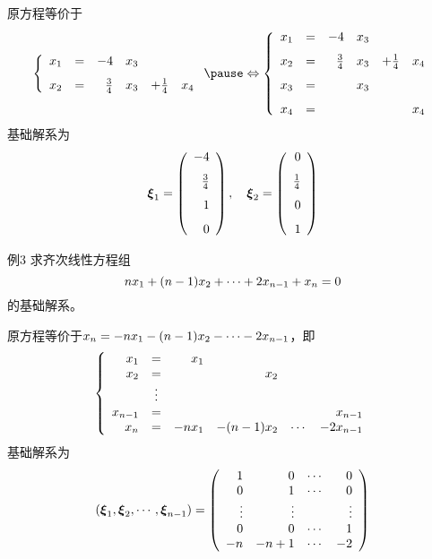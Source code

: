 \begin{frame}
  \begin{footnotesize}
    原方程等价于
    $$\left\{
    \begin{array}{rcrcrc}
      x_1&=&-4&x_3&&\\[0.1in]
      x_2&=&\frac34&x_3&+\frac14&x_4
    \end{array}
    \right. \pause \Leftrightarrow
    \left\{
    \begin{array}{rcrcrc}
      x_1&=&-4&x_3&&\\[0.1in]
      x_2&=&\frac34&x_3&+\frac14&x_4\\[0.1in]
      x_3&=&&x_3&&\\[0.1in]
      x_4&=&&&&x_4      
    \end{array}
    \right.
    $$
    \pause
    基础解系为
    $$
    \boldsymbol{\xi}_1 = \left(
    \begin{array}{r}
      -4\\[0.1in]
      \frac34\\[0.1in]
      1\\[0.1in]
      0
    \end{array}
    \right), \quad \boldsymbol{\xi}_2 = \left(
    \begin{array}{r}
      0\\[0.1in]
      \frac14\\[0.1in]
      0\\[0.1in]
      1
    \end{array}
    \right)
    $$
  \end{footnotesize}
\end{frame}

\begin{frame}
  \begin{footnotesize}
    \begin{exampleblock}{例3}
      求齐次线性方程组
      $$
      nx_1+(n-1)x_2+\cdots+2x_{n-1}+x_n=0
      $$
      的基础解系。      
    \end{exampleblock}
    \pause
    \jiename
    原方程等价于$x_n=-nx_1-(n-1)x_2-\cdots-2x_{n-1}$，\pause 即
    $$
    \left\{
    \begin{array}{rcrrrr}
      x_1&=&x_1&&&\\
      x_2&=&&x_2&&\\
      &\vdots&&&&\\
      x_{n-1}&=&&&&x_{n-1}\\      
      x_n&=&-nx_1&-(n-1)x_2&\cdots&-2x_{n-1}
    \end{array}    
    \right.
    $$
    \pause
    基础解系为
    $$
    (\boldsymbol{\xi}_1,\boldsymbol{\xi}_2,\cdots,\boldsymbol{\xi}_{n-1})=\left(
    \begin{array}{rrrr}
      1&0&\cdots&0\\
      0&1&\cdots&0\\
      \vdots&\vdots&&\vdots\\
      0&0&\cdots&1\\
      -n&-n+1&\cdots&-2
    \end{array}
    \right)
    $$
  \end{footnotesize}
\end{frame}

